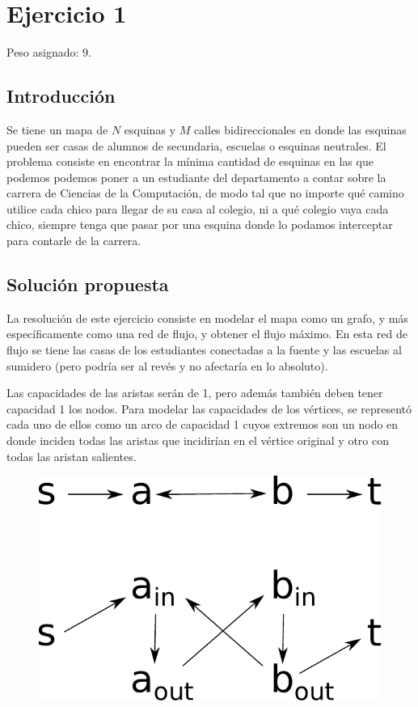 \section{Ejercicio 1}

Peso asignado: 9.

\subsection{Introducción}

Se tiene un mapa de $N$ esquinas y $M$ calles bidireccionales en donde las
esquinas pueden ser casas de alumnos de secundaria, escuelas o esquinas
neutrales. El problema consiste en encontrar la mínima cantidad de esquinas en
las que podemos podemos poner a un estudiante del departamento a contar sobre
la carrera de Ciencias de la Computación, de modo tal que no importe qué
camino utilice cada chico para llegar de su casa al colegio, ni a qué colegio
vaya cada chico, siempre tenga que pasar por una esquina donde lo podamos
interceptar para contarle de la carrera.

\subsection{Solución propuesta}

La resolución de este ejercicio consiste en modelar el mapa como un grafo, y
más específicamente como una red de flujo, y obtener el flujo máximo. En esta
red de flujo se tiene las casas de los estudiantes conectadas a la fuente y
las escuelas al sumidero (pero podría ser al revés y no afectaría en lo
absoluto).

Las capacidades de las aristas serán de 1, pero además también deben tener
capacidad 1 los nodos. Para modelar las capacidades de los vértices, se
representó cada uno de ellos como un arco de capacidad 1 cuyos extremos son un
nodo en donde inciden todas las aristas que incidirían en el vértice original
y otro con todas las aristan salientes.

\begin{figure}[H]
\centering
\includegraphics[scale=0.6]{imagenes/ej1_capacidades_nodos.pdf}
\end{figure}

